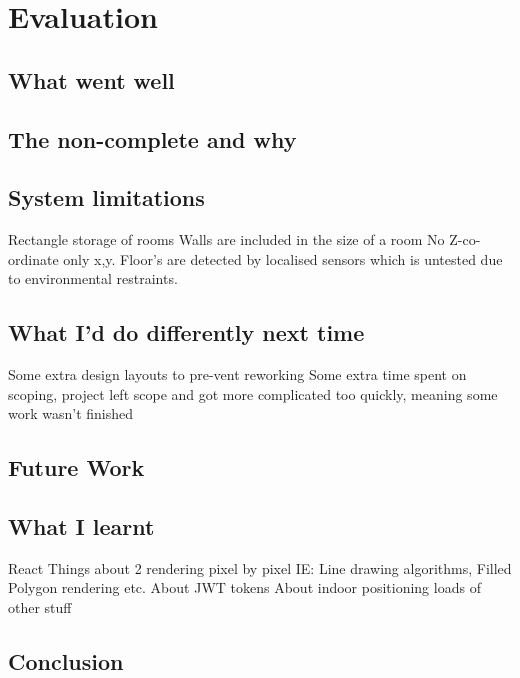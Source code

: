 \section{Evaluation}

\subsection{What went well} %

\subsection{The non-complete and why}

\subsection{System limitations} 
Rectangle storage of rooms
Walls are included in the size of a room
No Z-co-ordinate only x,y. Floor's are detected by localised sensors which is untested due to environmental restraints.

\subsection{What I'd do differently next time}
Some extra design layouts to pre-vent reworking
Some extra time spent on scoping, project left scope and got more complicated too quickly, meaning some work wasn't finished
\subsection{Future Work}

\subsection{What I learnt} %
React
Things about 2 rendering pixel by pixel IE: Line drawing algorithms, Filled Polygon rendering etc.
About JWT tokens
About indoor positioning
loads of other stuff

\subsection{Conclusion}